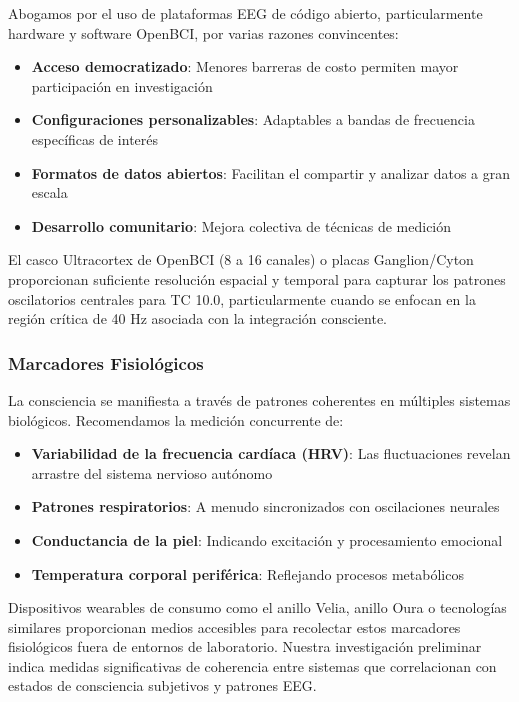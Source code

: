 \documentclass[12pt]{article}
\begin{document}
Abogamos por el uso de plataformas EEG de código abierto, particularmente hardware y software OpenBCI, por varias razones convincentes:

\begin{itemize}
    \item \textbf{Acceso democratizado}: Menores barreras de costo permiten mayor participación en investigación
    \item \textbf{Configuraciones personalizables}: Adaptables a bandas de frecuencia específicas de interés
    \item \textbf{Formatos de datos abiertos}: Facilitan el compartir y analizar datos a gran escala
    \item \textbf{Desarrollo comunitario}: Mejora colectiva de técnicas de medición
\end{itemize}

El casco Ultracortex de OpenBCI (8 a 16 canales) o placas Ganglion/Cyton proporcionan suficiente resolución espacial y temporal para capturar los patrones oscilatorios centrales para TC 10.0, particularmente cuando se enfocan en la región crítica de 40 Hz asociada con la integración consciente.

\subsubsection{Marcadores Fisiológicos}

La consciencia se manifiesta a través de patrones coherentes en múltiples sistemas biológicos. Recomendamos la medición concurrente de:

\begin{itemize}
    \item \textbf{Variabilidad de la frecuencia cardíaca (HRV)}: Las fluctuaciones revelan arrastre del sistema nervioso autónomo
    \item \textbf{Patrones respiratorios}: A menudo sincronizados con oscilaciones neurales
    \item \textbf{Conductancia de la piel}: Indicando excitación y procesamiento emocional
    \item \textbf{Temperatura corporal periférica}: Reflejando procesos metabólicos
\end{itemize}

Dispositivos wearables de consumo como el anillo Velia, anillo Oura o tecnologías similares proporcionan medios accesibles para recolectar estos marcadores fisiológicos fuera de entornos de laboratorio. Nuestra investigación preliminar indica medidas significativas de coherencia entre sistemas que correlacionan con estados de consciencia subjetivos y patrones EEG.
\end{document}
